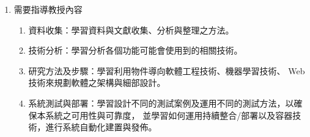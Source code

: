 \documentclass[12pt]{article}
\begin{document}
\begin{enumerate}
\begin{thebibliography}{99}
       Krusche, Stephan, and Andreas Seitz. "Artemis: An automatic assessment management system for interactive learning." Proceedings of the 49th ACM technical symposium on computer science education. 2018.
       Dong, Yu, Jingyang Hou, and Xuesong Lu. "An intelligent online judge system for programming training." Database Systems for Advanced Applications: 25th International Conference, DASFAA 2020, Jeju, South Korea, September 24–27, 2020, Proceedings, Part III 25. Springer International Publishing, 2020.
       api-client. Available from: https://github.com/online-judge-tools/api-client
       go-judge. Available from: https://github.com/criyle/go-judge
       JudgeServer. Available from: https://github.com/helsonxiao/JudgeServer
    \end{thebibliography} 

  \item 需要指導教授內容
    \begin{enumerate}
      \setlength{\parindent}{2em}
      \item 資料收集：學習資料與文獻收集、分析與整理之方法。
      \item 技術分析：學習分析各個功能可能會使用到的相關技術。
      \item 研究方法及步驟：學習利用物件導向軟體工程技術、機器學習技術、
      Web技術來規劃軟體之架構與細部設計。
      \item 系統測試與部署：學習設計不同的測試案例及運用不同的測試方法，以確保本系統之可用性與可靠度，
      並學習如何運用持續整合/部署以及容器技術，進行系統自動化建置與發佈。
    \end{enumerate}
\end{enumerate}
\end{document}
